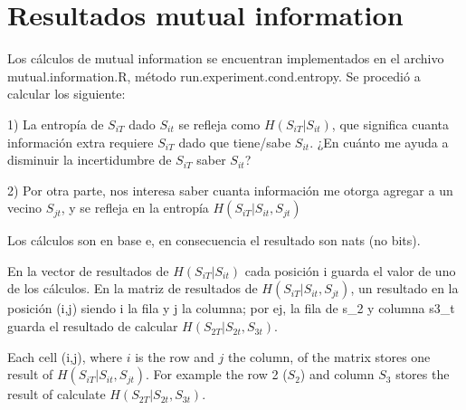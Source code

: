 \documentclass[final,a4paper]{llncs}
\begin{document}


\section{Resultados mutual information}

Los cálculos de mutual information se encuentran implementados
en el archivo mutual.information.R, método run.experiment.cond.entropy.
Se procedió a calcular los siguiente:

1) La entropía de $S_{iT}$ dado $S_{it}$ se refleja como $H(S_{iT}|S_{it})$, que 
significa cuanta información extra requiere  $S_{iT}$ dado que tiene/sabe $S_{it}$.
¿En cuánto me ayuda a disminuir la incertidumbre de $S_{iT}$ 
saber $S_{it}$?

2) Por otra parte, nos interesa saber cuanta información me otorga agregar a un vecino
$S_{jt}$, y se refleja en la entropía $H(S_{iT}|S_{it},S_{jt})$

Los cálculos son en base e, en consecuencia el resultado son nats (no bits).

En la vector de resultados de $H(S_{iT}|S_{it})$ cada posición i guarda el valor de uno
de los cálculos. En la matriz de resultados de $H(S_{iT}|S_{it},S_{jt})$, un resultado 
en la posición (i,j) siendo i la fila y j la columna; por ej, la fila de s\_2 y 
columna  s3\_t guarda el 
resultado de calcular $H(S_{2T}|S_{2t},S_{3t})$.

Each cell (i,j), where $i$ is the row
and $j$ the column,
 of the matrix stores one result of $H(S_{iT}|S_{it},S_{jt})$. 
 For example the row 2 ($S_2$) and column $S_3$ stores the result of calculate
$H(S_{2T}|S_{2t},S_{3t})$.
\end{document}
